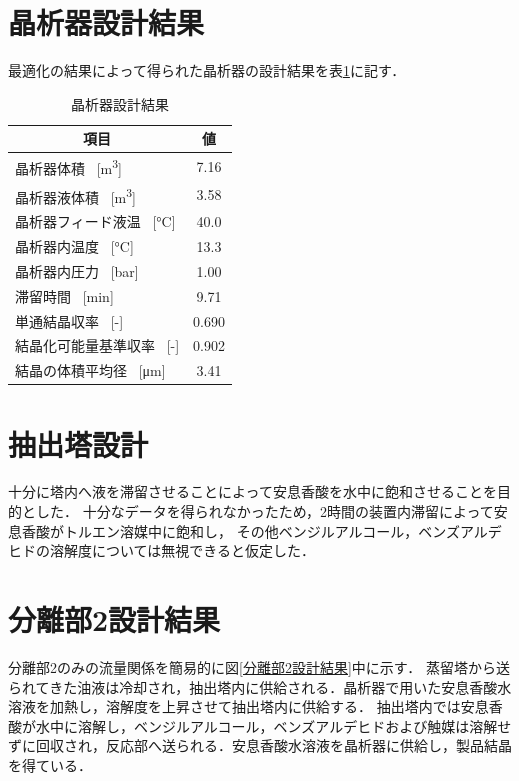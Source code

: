 \documentclass[a4j]{jsreport}
\begin{document}
\section{晶析器設計結果}
最適化の結果によって得られた晶析器の設計結果を表\ref{晶析器設計結果}に記す．
\begin{table}[htbp]
  \centering
  \caption{晶析器設計結果}
  \label{晶析器設計結果}
  \begin{tabular}{lc}
    \hline
    \multicolumn{1}{c}{項目} & 値 \\
    \hline
    晶析器体積 \, [\si{\cubic \metre}] &7.16 \\
    晶析器液体積 \, [\si{\cubic \metre}] &3.58 \\
    晶析器フィード液温 \, [\si{\degreeCelsius}] & 40.0 \\
    晶析器内温度 \, [\si{\degreeCelsius}] &13.3 \\
    晶析器内圧力 \, [\si{bar}] &1.00 \\
    滞留時間 \, [\si{min}] &9.71    \\
    単通結晶収率 \, [\si{-}] &0.690   \\
    結晶化可能量基準収率 \, [\si{-}] &0.902 \\
    結晶の体積平均径 \, [\si{\micro \metre}] &3.41 \\
    \hline
  \end{tabular}
\end{table}

\section{抽出塔設計}
十分に塔内へ液を滞留させることによって安息香酸を水中に飽和させることを目的とした．
十分なデータを得られなかったため，2時間の装置内滞留によって安息香酸がトルエン溶媒中に飽和し，
その他ベンジルアルコール，ベンズアルデヒドの溶解度については無視できると仮定した．

\section{分離部2設計結果}
分離部2のみの流量関係を簡易的に図\ref{分離部2設計結果}中に示す．
蒸留塔から送られてきた油液は冷却され，抽出塔内に供給される．晶析器で用いた安息香酸水溶液を加熱し，溶解度を上昇させて抽出塔内に供給する．
抽出塔内では安息香酸が水中に溶解し，ベンジルアルコール，ベンズアルデヒドおよび触媒は溶解せずに回収され，反応部へ送られる．安息香酸水溶液を晶析器に供給し，製品結晶を得ている．
\end{document}
